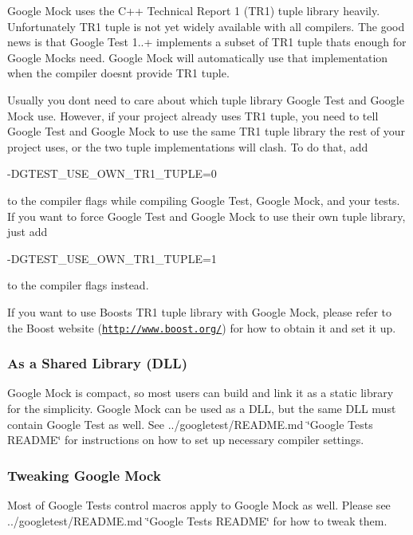 Google Mock uses the C++ Technical Report 1 (T\+R1) tuple library heavily. Unfortunately T\+R1 tuple is not yet widely available with all compilers. The good news is that Google Test 1..+ implements a subset of T\+R1 tuple that\textquotesingle{}s enough for Google Mock\textquotesingle{}s need. Google Mock will automatically use that implementation when the compiler doesn\textquotesingle{}t provide T\+R1 tuple.

Usually you don\textquotesingle{}t need to care about which tuple library Google Test and Google Mock use. However, if your project already uses T\+R1 tuple, you need to tell Google Test and Google Mock to use the same T\+R1 tuple library the rest of your project uses, or the two tuple implementations will clash. To do that, add \begin{DoxyVerb}-DGTEST_USE_OWN_TR1_TUPLE=0
\end{DoxyVerb}


to the compiler flags while compiling Google Test, Google Mock, and your tests. If you want to force Google Test and Google Mock to use their own tuple library, just add \begin{DoxyVerb}-DGTEST_USE_OWN_TR1_TUPLE=1
\end{DoxyVerb}


to the compiler flags instead.

If you want to use Boost\textquotesingle{}s T\+R1 tuple library with Google Mock, please refer to the Boost website (\href{http://www.boost.org/}{\tt http\+://www.\+boost.\+org/}) for how to obtain it and set it up.

\subsubsection*{As a Shared Library (D\+LL)}

Google Mock is compact, so most users can build and link it as a static library for the simplicity. Google Mock can be used as a D\+LL, but the same D\+LL must contain Google Test as well. See ../googletest/\+R\+E\+A\+D\+ME.md \char`\"{}\+Google Test\textquotesingle{}s R\+E\+A\+D\+M\+E\char`\"{} for instructions on how to set up necessary compiler settings.

\subsubsection*{Tweaking Google Mock}

Most of Google Test\textquotesingle{}s control macros apply to Google Mock as well. Please see ../googletest/\+R\+E\+A\+D\+ME.md \char`\"{}\+Google Test\textquotesingle{}s R\+E\+A\+D\+M\+E\char`\"{} for how to tweak them.

